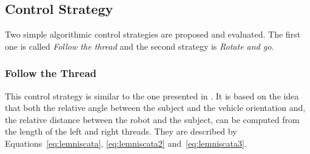 \documentclass[journal]{IEEEtran}
\begin{document}


%
%
%
%



\subsection{Control Strategy}

Two simple algorithmic control strategies are proposed and evaluated.  The first one is called \textit{Follow the thread} and the second strategy is \textit{Rotate and go}.  %

\subsubsection{Follow the Thread}

This control strategy is similar to the one presented in \cite{Ortlieb2016}.  It is based on the idea that both the relative angle between the subject and the vehicle orientation and, the relative distance between the robot and the subject, can be computed from the length of the left and right threads.  They are described by Equations~\ref{eq:lemniscata}, \ref{eq:lemniscata2} and~\ref{eq:lemniscata3}.
\end{document}
